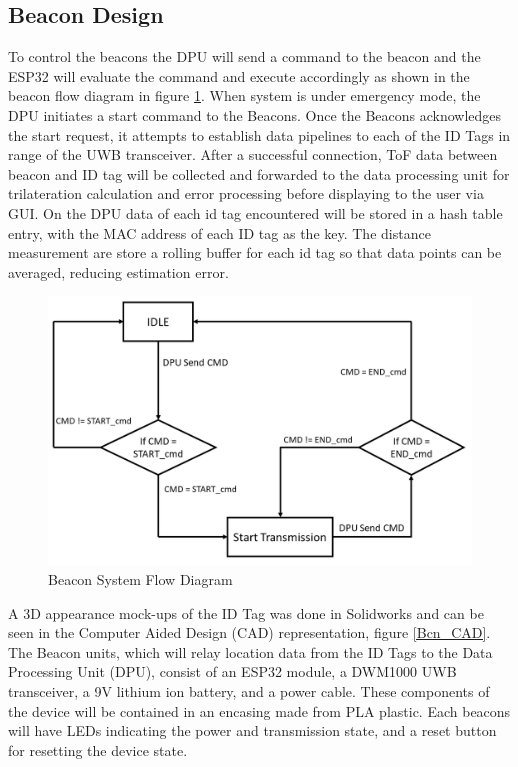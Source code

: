 \subsection{Beacon Design}
To control the beacons the DPU will send a command to the beacon and the ESP32 will evaluate the command and execute accordingly as shown in the beacon flow diagram in figure \ref{bcn_flow}. When system is under emergency mode, the DPU initiates a start command to the Beacons. Once the Beacons acknowledges the start request, it attempts to establish data pipelines to each of the ID Tags in range of the UWB transceiver. After a successful connection, ToF data between beacon and ID tag will be collected and forwarded to the data processing unit for trilateration calculation and error processing before displaying to the user via GUI. On the DPU data of each id tag encountered will be stored in a hash table entry, with the \Gls{MAC} address of each ID tag as the key. The distance measurement are store a rolling buffer for each id tag so that data points can be averaged, reducing estimation error.\\

\bigskip
\begin{figure}[H]
\centering
    \includegraphics[width=\linewidth]{./images/beacon_flow.png}
    \caption{Beacon System Flow Diagram}
    \label{bcn_flow}
\end{figure}
\medskip

\pagebreak
A 3D appearance mock-ups of the ID Tag was done in Solidworks and can be seen in the Computer Aided Design (CAD) representation, figure \ref{Bcn_CAD}. The Beacon units, which will relay location data from the ID Tags to the Data Processing Unit (DPU), consist of an ESP32 module, a DWM1000 UWB transceiver, a 9V lithium ion battery, and a power cable. These components of the device will be contained in an encasing made from \Gls{PLA} plastic. Each beacons will have LEDs indicating the power and transmission state, and a reset button for resetting the device state. 

